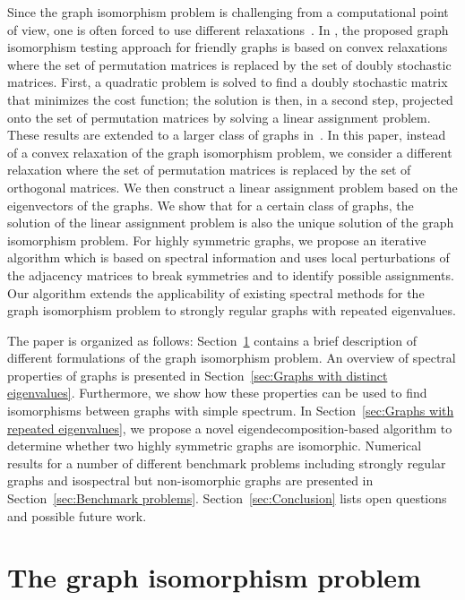 \documentclass
[
    a4paper,
    DIV=11,
    abstracton
]
{scrartcl}
\theoremstyle{definition}
\begin{document}
Since the graph isomorphism problem is challenging from a computational point of view, one is often forced to use different relaxations~\cite{FS15}. In \cite{ABK15}, the proposed graph isomorphism testing approach for friendly graphs is based on convex relaxations where the set of permutation matrices is replaced by the set of doubly stochastic matrices. First, a quadratic problem is solved to find a doubly stochastic matrix that minimizes the cost function; the solution is then, in a second step, projected onto the set of permutation matrices by solving a linear assignment problem. These results are extended to a larger class of graphs in~\cite{FS15}. In this paper, instead of a convex relaxation of the graph isomorphism problem, we consider a different relaxation where the set of permutation matrices is replaced by the set of orthogonal matrices. We then construct a linear assignment problem based on the eigenvectors of the graphs. We show that for a certain class of graphs, the solution of the linear assignment problem is also the unique solution of the graph isomorphism problem. For highly symmetric graphs, we propose an iterative algorithm which is based on spectral information and uses local perturbations of the adjacency matrices to break symmetries and to identify possible assignments. Our algorithm extends the applicability of existing spectral methods for the graph isomorphism problem to strongly regular graphs with repeated eigenvalues.

The paper is organized as follows: Section~\ref{sec:The graph isomorphism problem} contains a brief description of different formulations of the graph isomorphism problem. An overview of spectral properties of graphs is presented in Section~\ref{sec:Graphs with distinct eigenvalues}. Furthermore, we show how these properties can be used to find isomorphisms between graphs with simple spectrum. In Section~\ref{sec:Graphs with repeated eigenvalues}, we propose a novel eigendecomposition-based algorithm to determine whether two highly symmetric graphs are isomorphic. Numerical results for a number of different benchmark problems including strongly regular graphs and isospectral but non-isomorphic graphs are presented in Section~\ref{sec:Benchmark problems}. Section~\ref{sec:Conclusion} lists open questions and possible future work.

\section{The graph isomorphism problem}
\label{sec:The graph isomorphism problem}
\end{document}
